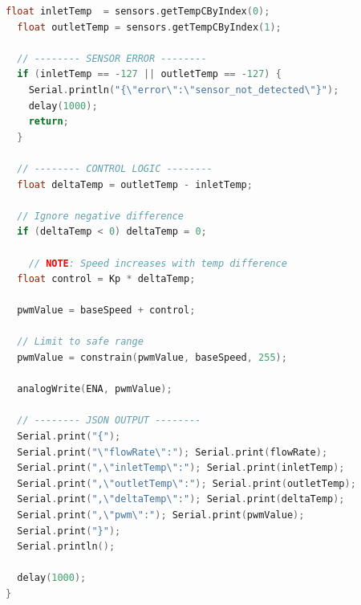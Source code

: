 \documentclass[12pt,a4paper]{report}
\begin{document}
\begin{lstlisting}[language=C++]
  float inletTemp  = sensors.getTempCByIndex(0);
  float outletTemp = sensors.getTempCByIndex(1);

  // -------- SENSOR ERROR --------
  if (inletTemp == -127 || outletTemp == -127) {
    Serial.println("{\"error\":\"sensor_not_detected\"}");
    delay(1000);
    return;
  }

  // -------- CONTROL LOGIC --------
  float deltaTemp = outletTemp - inletTemp;

  // Ignore negative difference
  if (deltaTemp < 0) deltaTemp = 0;

    // NOTE: Speed increases with temp difference
  float control = Kp * deltaTemp;

  pwmValue = baseSpeed + control;

  // Limit to safe range
  pwmValue = constrain(pwmValue, baseSpeed, 255);

  analogWrite(ENA, pwmValue);

  // -------- JSON OUTPUT --------
  Serial.print("{");
  Serial.print("\"flowRate\":"); Serial.print(flowRate);
  Serial.print(",\"inletTemp\":"); Serial.print(inletTemp);
  Serial.print(",\"outletTemp\":"); Serial.print(outletTemp);
  Serial.print(",\"deltaTemp\":"); Serial.print(deltaTemp);
  Serial.print(",\"pwm\":"); Serial.print(pwmValue);
  Serial.print("}");
  Serial.println();

  delay(1000);
}
\end{lstlisting}
\end{document}
